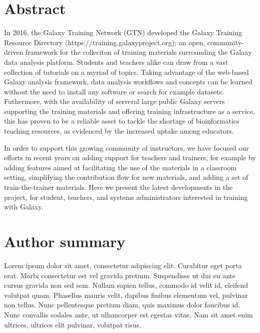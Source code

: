 \documentclass[10pt,letterpaper]{article}
\begin{document}
\section*{Abstract}In 2016, the Galaxy Training Network (GTN) developed the Galaxy Training Resource Directory (https://training.galaxyproject.org); an open, community-driven framework for the colleciton of training materials surrounding the Galaxy data analysis platform. Students and teachers alike can draw from a vast collection of tutorials on a myriad of topics. Taking advantage of the web-based Galaxy analysis framework, data analysis workflows and concepts can be learned without the need to install any software or search for example datasets. Futhermore, with the availability of serveral large public Galaxy servers supporting the training materials and offering training infrastructure as a service, this has proven to be a reliable asset to tackle the shortage of bioinformatics teaching resources, as evidenced by the increased uptake among educators.

In order to support this growing community of instructors, we have focused our efforts in recent years on adding support for teachers and trainers, for example by adding features aimed at facilitating the use of the materials in a classroom setting, simplifying the contribution flow for new materials, and adding a set of train-the-trainer materials. Here we present the latest developments in the project, for student, teachers, and systems administrators interested in training with Galaxy.



\section*{Author summary}
Lorem ipsum dolor sit amet, consectetur adipiscing elit. Curabitur eget porta erat. Morbi consectetur est vel gravida pretium. Suspendisse ut dui eu ante cursus gravida non sed sem. Nullam sapien tellus, commodo id velit id, eleifend volutpat quam. Phasellus mauris velit, dapibus finibus elementum vel, pulvinar non tellus. Nunc pellentesque pretium diam, quis maximus dolor faucibus id. Nunc convallis sodales ante, ut ullamcorper est egestas vitae. Nam sit amet enim ultrices, ultrices elit pulvinar, volutpat risus.

\end{document}
